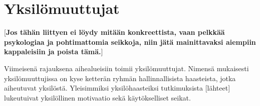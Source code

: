 \chapter{Yksilömuuttujat}

[\textbf{Jos tähän liittyen ei löydy mitään konkreettista, vaan pelkkää psykologiaa ja pohtimattomia seikkoja, niin jätä mainittavaksi aiempiin kappaleisiin ja poista tämä.}]

Viimeisenä rajauksena aihealueisiin toimii yksilömuuttujat. Nimensä mukaisesti yksilömuuttujissa on kyse ketterän ryhmän hallinnallisista haasteista, jotka aiheutuvat yksilöstä. Yleisimmiksi yksilöhaasteiksi tutkimuksista [lähteet] lukeutuivat yksilöllinen motivaatio sekä käytökselliset seikat.
